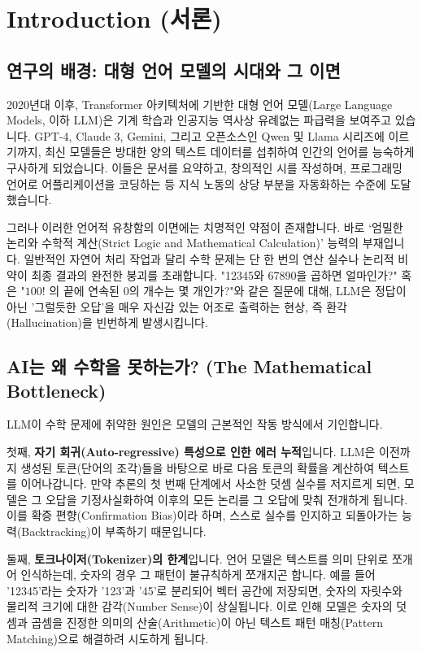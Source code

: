 \section{Introduction (서론)}

\subsection{연구의 배경: 대형 언어 모델의 시대와 그 이면}
2020년대 이후, Transformer 아키텍처에 기반한 대형 언어 모델(Large Language Models, 이하 LLM)은 기계 학습과 인공지능 역사상 유례없는 파급력을 보여주고 있습니다. GPT-4, Claude 3, Gemini, 그리고 오픈소스인 Qwen 및 Llama 시리즈에 이르기까지, 최신 모델들은 방대한 양의 텍스트 데이터를 섭취하여 인간의 언어를 능숙하게 구사하게 되었습니다. 이들은 문서를 요약하고, 창의적인 시를 작성하며, 프로그래밍 언어로 어플리케이션을 코딩하는 등 지식 노동의 상당 부분을 자동화하는 수준에 도달했습니다.

그러나 이러한 언어적 유창함의 이면에는 치명적인 약점이 존재합니다. 바로 `엄밀한 논리와 수학적 계산(Strict Logic and Mathematical Calculation)' 능력의 부재입니다. 일반적인 자연어 처리 작업과 달리 수학 문제는 단 한 번의 연산 실수나 논리적 비약이 최종 결과의 완전한 붕괴를 초래합니다. "12345와 67890을 곱하면 얼마인가?" 혹은 "$100!$ 의 끝에 연속된 $0$의 개수는 몇 개인가?"와 같은 질문에 대해, LLM은 정답이 아닌 '그럴듯한 오답'을 매우 자신감 있는 어조로 출력하는 현상, 즉 환각(Hallucination)을 빈번하게 발생시킵니다.

\subsection{AI는 왜 수학을 못하는가? (The Mathematical Bottleneck)}
LLM이 수학 문제에 취약한 원인은 모델의 근본적인 작동 방식에서 기인합니다. 

첫째, \textbf{자기 회귀(Auto-regressive) 특성으로 인한 에러 누적}입니다. LLM은 이전까지 생성된 토큰(단어의 조각)들을 바탕으로 바로 다음 토큰의 확률을 계산하여 텍스트를 이어나갑니다. 만약 추론의 첫 번째 단계에서 사소한 덧셈 실수를 저지르게 되면, 모델은 그 오답을 기정사실화하여 이후의 모든 논리를 그 오답에 맞춰 전개하게 됩니다. 이를 확증 편향(Confirmation Bias)이라 하며, 스스로 실수를 인지하고 되돌아가는 능력(Backtracking)이 부족하기 때문입니다.

둘째, \textbf{토크나이저(Tokenizer)의 한계}입니다. 언어 모델은 텍스트를 의미 단위로 쪼개어 인식하는데, 숫자의 경우 그 패턴이 불규칙하게 쪼개지곤 합니다. 예를 들어 '12345'라는 숫자가 '123'과 '45'로 분리되어 벡터 공간에 저장되면, 숫자의 자릿수와 물리적 크기에 대한 감각(Number Sense)이 상실됩니다. 이로 인해 모델은 숫자의 덧셈과 곱셈을 진정한 의미의 산술(Arithmetic)이 아닌 텍스트 패턴 매칭(Pattern Matching)으로 해결하려 시도하게 됩니다.

